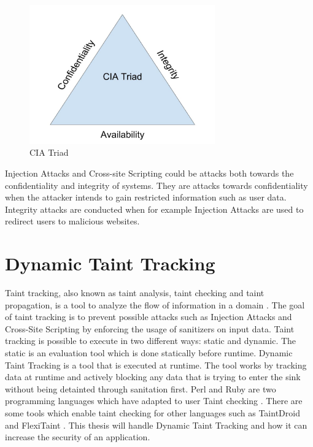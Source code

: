 \begin{figure}
    \centering
    \includegraphics[height=6cm]{images/CIATriad.jpg}
    \caption{CIA Triad}
    \label{fig:CIATriad}
\end{figure}

Injection Attacks and Cross-site Scripting could be attacks both towards the confidentiality and integrity of systems. They are attacks towards confidentiality when the attacker intends to gain restricted information such as user data. Integrity attacks are conducted when for example Injection Attacks are used to redirect users to malicious websites.



\section{Dynamic Taint Tracking}
\label{DynamicTaintTracking}
Taint tracking, also known as taint analysis, taint checking and taint propagation, is a tool to analyze the flow of information in a domain \parencite{Pan2015}. The goal of taint tracking is to prevent possible attacks such as Injection Attacks and Cross-Site Scripting by enforcing the usage of sanitizers on input data. Taint tracking is possible to execute in two different ways: static and dynamic. The static is an evaluation tool which is done statically before runtime. Dynamic Taint Tracking is a tool that is executed at runtime. The tool works by tracking data at runtime and actively blocking any data that is trying to enter the sink without being detainted through sanitation first. Perl and Ruby are two programming languages which have adapted to user Taint checking \parencite{perl, ruby}. There are some tools which enable taint checking for other languages such as TaintDroid \parencite{Ma2010} and FlexiTaint \parencite{Venkataramani2008}. This thesis will handle Dynamic Taint Tracking and how it can increase the security of an application.

